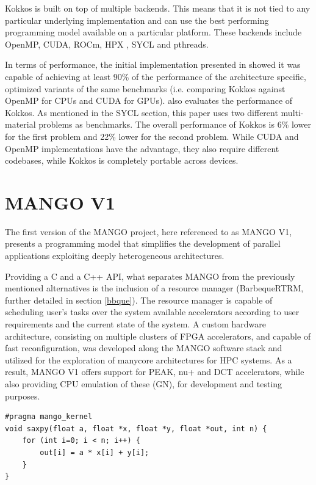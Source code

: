 Kokkos is built on top of multiple backends. This means that it is not tied to any particular underlying implementation and can use the best performing programming model available on a particular platform. These backends include OpenMP, CUDA, ROCm, HPX \cite{hpx}, SYCL and pthreads.

In terms of performance, the initial implementation presented in \cite{kokkos} showed it was capable of achieving at least 90\% of the performance of the architecture specific, optimized variants of the same benchmarks (i.e. comparing Kokkos against OpenMP for CPUs and CUDA for GPUs). \cite{performance_portability_multimaterial_kernels} also evaluates the performance of Kokkos. As mentioned in the SYCL section, this paper uses two different multi-material problems as benchmarks. The overall performance of Kokkos is 6\% lower for the first problem and 22\% lower for the second problem. While CUDA and OpenMP implementations have the advantage, they also require different codebases, while Kokkos is completely portable across devices.


\section{MANGO V1} \label{sect:mangov1}
The first version of the MANGO project, here referenced to as MANGO V1, presents a programming model that simplifies the development of parallel applications exploiting deeply heterogeneous architectures. 

Providing a C and a C++ API, what separates MANGO from the previously mentioned alternatives is the inclusion of a resource manager (BarbequeRTRM, further detailed in section \ref{bbque}). The resource manager is capable of scheduling user's tasks over the system available accelerators according to user requirements and the current state of the system. 
A custom hardware architecture, consisting on multiple clusters of FPGA accelerators, and capable of fast reconfiguration, was developed along the MANGO software stack and utilized for the exploration of manycore architectures for HPC systems.
As a result, MANGO V1 offers support for PEAK, nu+ and DCT accelerators, while also providing CPU emulation of these (GN), for development and testing purposes.

\begin{lstlisting}[style=CStyle, caption=MANGO GN saxpy example (kernel), floatplacement=H, label={lst:mangov1_kernel_sample}]
#pragma mango_kernel
void saxpy(float a, float *x, float *y, float *out, int n) {
    for (int i=0; i < n; i++) {
	    out[i] = a * x[i] + y[i];
    }
}
\end{lstlisting}

